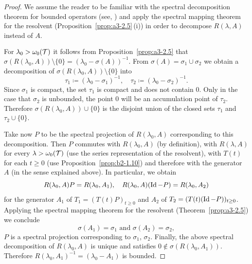 \begin{proof}
We assume the reader to be familiar with the spectral decomposition theorem for bounded operators (see, \eg \textcite[p.572]{dunfordschwartz:1958}) and apply the spectral mapping theorem for the resolvent (Proposition~\ref{prop:a3-2.5}\,(i)) in order to decompose $R(\lambda,A)$ instead of\/ $A$.

For $\lambda_{0} > \omega_{0}(\mathcal{T})$ it follows from Proposition~\ref{prop:a3-2.5} that $\sigma(R(\lambda_{0},A)) \setminus \{0\} = (\lambda_{0} - \sigma(A))^{-1}$.
From $\sigma(A) = \sigma_{1} \cup \sigma_{2}$ we obtain a decomposition of\/ $\sigma(R(\lambda_{0},A)) \setminus \{0\}$ into
\[
	\tau_{1} \coloneq (\lambda_{0} - \sigma_{1})^{-1}, 
		\quad 
	\tau_{2} \coloneq (\lambda_{0} - \sigma_{2})^{-1} .
\]
Since $\sigma_{1}$ is compact, the set $\tau_{1}$ is compact and does not contain $0$.
Only in the case that $\sigma_{2}$ is unbounded, the point $0$ will be an accumulation point of\/ $\tau_{2}$.
Therefore $\sigma(R(\lambda_{0},A)) \cup \{0\}$ is the disjoint union of the closed sets $\tau_{1}$ and $\tau_{2} \cup \{0\}$.

Take now $P$ to be the spectral projection of\/ $R(\lambda_{0},A)$ corresponding to this decomposition.
Then $P$ commutes with $R(\lambda_{0},A)$ (by definition), with $R(\lambda,A)$ for every $\lambda > \omega_{0}(\mathcal{T})$ (use the series representation of the resolvent), with $T(t)$ for each $t \geq 0$ (use Proposition~\ref{prop:b2-1.10}) and therefore with the generator $A$ (in the sense explained above).
In particular, we obtain
\begin{equation*}\label{eq:a3-new}
R(\lambda_{0},A)P = R(\lambda_{0},A_{1}), \quad R(\lambda_{0},A)(\operatorname{Id}-P) = R(\lambda_{0},A_{2})
\end{equation*}
for the generator $A_{1}$ of\/ $T_{1} = (T(t)P)_{t \geq 0}$ and $A_{2}$ of\/ $T_{2} = (T(t)(\Id-P))_{t \geq 0}$.
Applying the spectral mapping theorem for the resolvent (Theorem~\ref{prop:a3-2.5})
we conclude
\[
\sigma(A_{1}) = \sigma_{1} \text{ and } \sigma(A_{2}) = \sigma_{2} ,
\]
\ie $P$ is a spectral projection corresponding to $\sigma_{1}$, $\sigma_{2}$.
Finally, the above spectral decomposition of\/ $R(\lambda_{0},A)$ is unique and satisfies $0 \notin \sigma(R(\lambda_{0},A_{1}))$.
Therefore $R(\lambda_{0},A_{1})^{-1} = (\lambda_{0}-A_{1})$ is bounded.
\end{proof}
